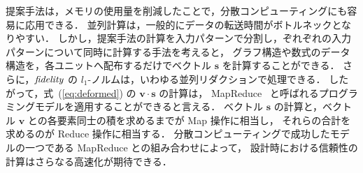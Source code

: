 提案手法は，メモリの使用量を削減したことで，分散コンピューティングにも容易に応用できる．
並列計算は，一般的にデータの転送時間がボトルネックとなりやすい．
しかし，提案手法の計算を入力パターンで分割し，ぞれぞれの入力パターンについて同時に計算する手法を考えると，
グラフ構造や数式のデータ構造を，各ユニットへ配布するだけでベクトル ${\bm s}$ を計算することができる．
さらに，${\it fidelity}$ の $l_1$-ノルムは，いわゆる並列リダクションで処理できる．
したがって，式~(\ref{eq:deformed}) の ${\bm v} \cdot {\bm s}$ の計算は，
MapReduce~\cite{mapreduce} と呼ばれるプログラミングモデルを適用することができると言える．
ベクトル ${\bm s}$ の計算と，ベクトル ${\bm v}$ との各要素同士の積を求めるまでが Map 操作に相当し，
それらの合計を求めるのが Reduce 操作に相当する．
分散コンピューティングで成功したモデルの一つである MapReduce との組み合わせによって，
設計時における信頼性の計算はさらなる高速化が期待できる．


